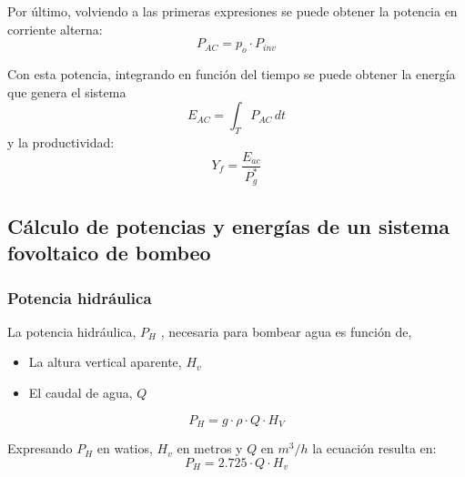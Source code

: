 Por último, volviendo a las primeras expresiones se puede obtener la potencia en corriente alterna:
\begin{equation}
P_{AC}=p_o\cdot P_{inv}
\end{equation}

Con esta potencia, integrando en función del tiempo se puede obtener la energía que genera el sistema
\begin{equation}
E_{AC}=\int_{T} P_{AC} \,dt
\end{equation}
y la productividad:
\begin{equation}
Y_f=\frac{E_{ac}}{P_g^*}
\end{equation}

\subsection{Cálculo de potencias y energías de un sistema fovoltaico de bombeo}
\label{sec:org25432e7}
\subsubsection{Potencia hidráulica}
\label{sec:orgf560a64}
La potencia hidráulica, \(P_H\) , necesaria para bombear agua es función de,
\begin{itemize}
\item La altura vertical aparente, \(H_v\) 
\item El caudal de agua, \(Q\)   
\end{itemize}
\begin{equation}
P_H=g\cdot \rho \cdot Q \cdot H_V
\end{equation}

Expresando \(P_H\) en watios, \(H_v\) en metros y \(Q\) en \(m^3/h\) la ecuación resulta en:
\begin{equation}
P_H=2.725\cdot Q \cdot H_v
\end{equation}


